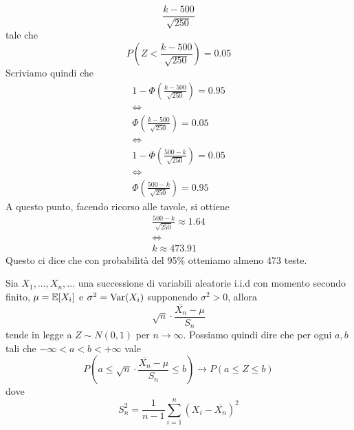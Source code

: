 \begin{example}
	\[ \frac{k - 500}{\sqrt{250}} \]
	tale che
	\[ P \left( Z < \frac{k - 500}{\sqrt{250}} \right) = 0.05 \]
	Scriviamo quindi che
	\begin{gather*}
		1 - \Phi \left( \frac{k - 500}{\sqrt{250}} \right) = 0.95 \\
		\Leftrightarrow \\
		\Phi \left( \frac{k - 500}{\sqrt{250}} \right) = 0.05 \\
		\Leftrightarrow \\
		1 - \Phi \left( \frac{500 - k}{\sqrt{250}} \right) = 0.05 \\
		\Leftrightarrow \\
		\Phi \left( \frac{500 - k}{\sqrt{250}} \right) = 0.95
	\end{gather*}
	A questo punto, facendo ricorso alle tavole, si ottiene
	\begin{gather*}
		\frac{500 - k}{\sqrt{250}} \approx 1.64 \\
		\Leftrightarrow \\
		k \approx 473.91
	\end{gather*}
	Questo ci dice che con probabilità del 95\% otteniamo almeno 473 teste.
\end{example}

\begin{proposition}
	Sia $X_1, \dots, X_n, \dots$ una successione di variabili aleatorie i.i.d con momento secondo
	finito, $\mu = \mathbb{E}[X_i]$ e $\sigma^2 = \operatorname{Var}(X_i)$ supponendo $\sigma^2 > 0$, allora
	\[ \sqrt{n} \cdot \frac{\overline{X_n}  - \mu}{S_n} \]
	tende in legge a $Z \sim N(0,1)$ per $n \to \infty$. Possiamo quindi dire che per ogni $a,b$
	tali che $-\infty < a < b < +\infty$ vale
	\[
		P \left( a \leq \sqrt{n} \cdot \frac{\overline{X_n}  - \mu}{S_n} \leq b \right) \to
		P(a \leq Z \leq b)
	\]
	dove
	\[ S_n^2 = \frac{1}{n-1} \sum_{i=1}^{n} (X_i - \overline{X_n})^2 \]
\end{proposition}